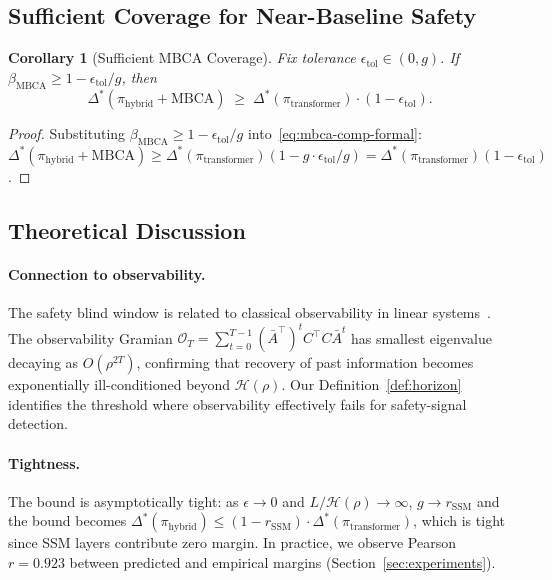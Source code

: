 \documentclass{article}
\newtheorem{corollary}[theorem]{Corollary}
\newcommand{\rSSM}{r_{\mathrm{SSM}}}
\newcommand{\deltaStar}{\Delta^{*}}
\newcommand{\piHybrid}{\pi_{\mathrm{hybrid}}}
\newcommand{\piTrans}{\pi_{\mathrm{transformer}}}
\newcommand{\Horizon}{\mathcal{H}(\rho)}
\newcommand{\MBCA}{\mathrm{MBCA}}
\newcommand{\betaMBCA}{\beta_{\MBCA}}
\begin{document}
\subsection{Sufficient Coverage for Near-Baseline Safety}

\begin{corollary}[Sufficient MBCA Coverage]
\label{cor:sufficient}
Fix tolerance $\epsilon_{\mathrm{tol}} \in (0, g)$. If $\betaMBCA \geq 1 - \epsilon_{\mathrm{tol}}/g$, then
\begin{equation}
    \deltaStar(\piHybrid + \MBCA) \;\geq\; \deltaStar(\piTrans) \cdot (1 - \epsilon_{\mathrm{tol}}).
\end{equation}
\end{corollary}

\begin{proof}
Substituting $\betaMBCA \geq 1 - \epsilon_{\mathrm{tol}}/g$ into~\eqref{eq:mbca-comp-formal}: $\deltaStar(\piHybrid + \MBCA) \geq \deltaStar(\piTrans)(1 - g \cdot \epsilon_{\mathrm{tol}}/g) = \deltaStar(\piTrans)(1 - \epsilon_{\mathrm{tol}})$.
\end{proof}

\subsection{Theoretical Discussion}

\paragraph{Connection to observability.}
The safety blind window is related to classical observability in linear systems~\cite{kalman1960}. The observability Gramian $\mathcal{O}_T = \sum_{t=0}^{T-1} (\bar{A}^\top)^t C^\top C \bar{A}^t$ has smallest eigenvalue decaying as $O(\rho^{2T})$, confirming that recovery of past information becomes exponentially ill-conditioned beyond $\Horizon$. Our Definition~\ref{def:horizon} identifies the threshold where observability effectively fails for safety-signal detection.

\paragraph{Tightness.}
The bound is asymptotically tight: as $\epsilon \to 0$ and $L/\Horizon \to \infty$, $g \to \rSSM$ and the bound becomes $\deltaStar(\piHybrid) \leq (1-\rSSM) \cdot \deltaStar(\piTrans)$, which is tight since SSM layers contribute zero margin. In practice, we observe Pearson $r = 0.923$ between predicted and empirical margins (Section~\ref{sec:experiments}).
\end{document}
